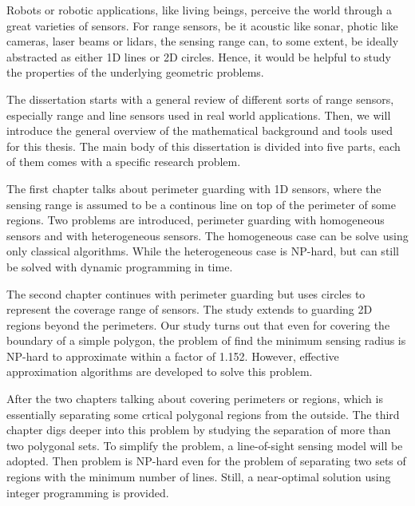 \begin{my_abstract}

Robots or robotic applications, like living beings, perceive the world through
a great varieties of sensors.
For range sensors, be it acoustic like sonar, photic like cameras, laser beams or lidars, 
the sensing range can, to some extent, be ideally abstracted as either 1D lines or 2D circles.
Hence, it would be helpful to study the properties of the underlying geometric problems.


The dissertation starts with a general review of different sorts of range sensors, 
especially range and line sensors used in real world applications. 
Then, we will introduce the general overview of the mathematical background and tools used for this thesis. 
The main body of this dissertation is divided into five parts, each of them comes with 
a specific research problem. 

The first chapter talks about perimeter guarding with 1D sensors, where the sensing range 
is assumed to be a continous line on top of the perimeter of some regions. Two problems are 
introduced, perimeter guarding with homogeneous sensors and with heterogeneous sensors. 
The homogeneous case can be solve using only classical algorithms. 
While the heterogeneous case is NP-hard, but can still be solved with dynamic programming in time. 

The second chapter continues with perimeter guarding but uses circles to represent the 
coverage range of sensors. The study extends to guarding 2D regions beyond the perimeters. 
Our study turns out that even for covering the boundary of a simple polygon, 
the problem of find the minimum sensing radius is NP-hard to approximate within a factor of 1.152. 
However, effective approximation algorithms are developed to solve this problem. 

After the two chapters talking about covering perimeters or regions, which is essentially separating 
some crtical polygonal regions from the outside. 
The third chapter digs deeper into this problem by studying the separation of more than two polygonal sets. 
To simplify the problem, a line-of-sight sensing model will be adopted. 
Then problem is NP-hard even for the problem of separating two sets of regions with the minimum number of lines.
Still, a near-optimal solution using integer programming is provided.


\end{my_abstract}
